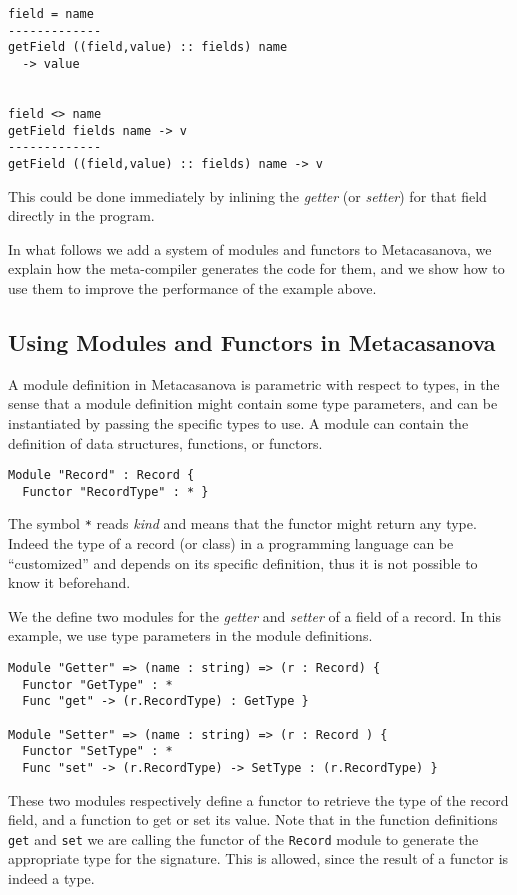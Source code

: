 \begin{lstlisting}
field = name
-------------
getField ((field,value) :: fields) name 
  -> value


field <> name
getField fields name -> v
-------------
getField ((field,value) :: fields) name -> v
\end{lstlisting}

\noindent
This could be done immediately by inlining the \textit{getter} (or \textit{setter}) for that field directly in the program.

In what follows we add a system of modules and functors to Metacasanova, we explain how the meta-compiler generates the code for them, and we show how to use them to improve the performance of the example above.

\subsection{Using Modules and Functors in Metacasanova}
\label{subsec:record_implementation}
A module definition in Metacasanova is parametric with respect to types, in the sense that a module definition might contain some type parameters, and can be instantiated by passing the specific types to use. A module can contain the definition of data structures, functions, or functors.

\begin{lstlisting}
Module "Record" : Record {
  Functor "RecordType" : * }
\end{lstlisting}

The symbol \texttt{*} reads \textit{kind} and means that the functor might return any type. Indeed the type of a record (or class) in a programming language can be ``customized'' and depends on its specific definition, thus it is not possible to know it beforehand.

We the define two modules for the \textit{getter} and \textit{setter} of a field of a record. In this example, we use type parameters in the module definitions.

\begin{lstlisting}
Module "Getter" => (name : string) => (r : Record) {
  Functor "GetType" : *
  Func "get" -> (r.RecordType) : GetType }
  
Module "Setter" => (name : string) => (r : Record ) {
  Functor "SetType" : *
  Func "set" -> (r.RecordType) -> SetType : (r.RecordType) }
\end{lstlisting}

\noindent
These two modules respectively define a functor to retrieve the type of the record field, and a function to get or set its value. Note that in the function definitions \texttt{get} and \texttt{set} we are calling the functor of the \texttt{Record} module to generate the appropriate type for the signature. This is allowed, since the result of a functor is indeed a type.

